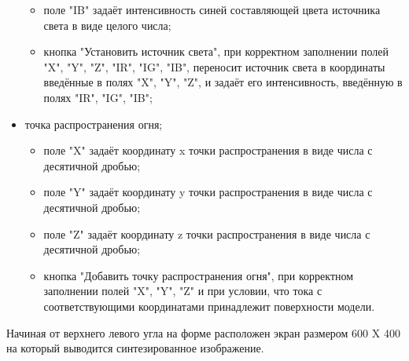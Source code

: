 \documentclass[a4paper,14pt]{report}
\begin{document}
\begin{itemize}
\begin{itemize}
\item поле "IB" задаёт интенсивность синей составляющей цвета источника света в виде целого числа;
\item кнопка "Установить источник света", при корректном заполнении полей "X", "Y", "Z", "IR", "IG", "IB", переносит источник света в координаты введённые в полях "X", "Y", "Z", и задаёт его интенсивность, введённую в полях "IR", "IG", "IB";
\end{itemize}
\item точка распространения огня;
\begin{itemize}
\item поле "X" задаёт координату x точки распространения в виде числа с десятичной дробью;
\item поле "Y" задаёт координату y точки распространения в виде числа с десятичной дробью;
\item поле "Z" задаёт координату z точки распространения в виде числа с десятичной дробью;
\item кнопка "Добавить точку распространения огня", при корректном заполнении полей "X", "Y", "Z" и при условии, что тока с соответствующими координатами принадлежит поверхности модели.
\end{itemize}
\end{itemize}
Начиная от верхнего левого угла на форме расположен экран размером 600 X 400 на который выводится синтезированное изображение.
\end{document}
